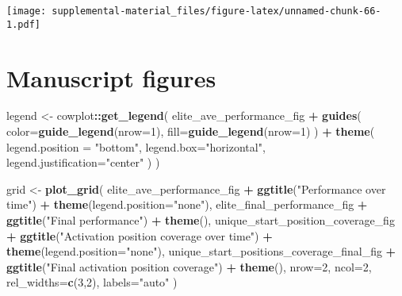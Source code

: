 \documentclass[]{book}
\newenvironment{Shaded}{\begin{snugshade}}{\end{snugshade}}
\newcommand{\DataTypeTok}[1]{\textcolor[rgb]{0.13,0.29,0.53}{#1}}
\newcommand{\DecValTok}[1]{\textcolor[rgb]{0.00,0.00,0.81}{#1}}
\newcommand{\KeywordTok}[1]{\textcolor[rgb]{0.13,0.29,0.53}{\textbf{#1}}}
\newcommand{\NormalTok}[1]{#1}
\newcommand{\OperatorTok}[1]{\textcolor[rgb]{0.81,0.36,0.00}{\textbf{#1}}}
\newcommand{\StringTok}[1]{\textcolor[rgb]{0.31,0.60,0.02}{#1}}
\begin{document}
\texttt{[image: supplemental-material\_files/figure-latex/unnamed-chunk-66-1.pdf]}

\hypertarget{manuscript-figures-5}{%
\section{Manuscript figures}\label{manuscript-figures-5}}

\begin{Shaded}
\begin{Highlighting}[]
\NormalTok{legend <-}\StringTok{ }\NormalTok{cowplot}\OperatorTok{::}\KeywordTok{get_legend}\NormalTok{(}
\NormalTok{    elite_ave_performance_fig }\OperatorTok{+}
\StringTok{      }\KeywordTok{guides}\NormalTok{(}
        \DataTypeTok{color=}\KeywordTok{guide_legend}\NormalTok{(}\DataTypeTok{nrow=}\DecValTok{1}\NormalTok{),}
        \DataTypeTok{fill=}\KeywordTok{guide_legend}\NormalTok{(}\DataTypeTok{nrow=}\DecValTok{1}\NormalTok{)}
\NormalTok{      ) }\OperatorTok{+}
\StringTok{      }\KeywordTok{theme}\NormalTok{(}
        \DataTypeTok{legend.position =} \StringTok{"bottom"}\NormalTok{,}
        \DataTypeTok{legend.box=}\StringTok{"horizontal"}\NormalTok{,}
        \DataTypeTok{legend.justification=}\StringTok{"center"}
\NormalTok{      )}
\NormalTok{  )}

\NormalTok{grid <-}\StringTok{ }\KeywordTok{plot_grid}\NormalTok{(}
\NormalTok{  elite_ave_performance_fig }\OperatorTok{+}
\StringTok{    }\KeywordTok{ggtitle}\NormalTok{(}\StringTok{"Performance over time"}\NormalTok{) }\OperatorTok{+}
\StringTok{    }\KeywordTok{theme}\NormalTok{(}\DataTypeTok{legend.position=}\StringTok{"none"}\NormalTok{),}
\NormalTok{  elite_final_performance_fig }\OperatorTok{+}
\StringTok{    }\KeywordTok{ggtitle}\NormalTok{(}\StringTok{"Final performance"}\NormalTok{) }\OperatorTok{+}
\StringTok{    }\KeywordTok{theme}\NormalTok{(),}
\NormalTok{  unique_start_position_coverage_fig }\OperatorTok{+}
\StringTok{    }\KeywordTok{ggtitle}\NormalTok{(}\StringTok{"Activation position coverage over time"}\NormalTok{) }\OperatorTok{+}
\StringTok{    }\KeywordTok{theme}\NormalTok{(}\DataTypeTok{legend.position=}\StringTok{"none"}\NormalTok{),}
\NormalTok{  unique_start_positions_coverage_final_fig }\OperatorTok{+}
\StringTok{    }\KeywordTok{ggtitle}\NormalTok{(}\StringTok{"Final activation position coverage"}\NormalTok{) }\OperatorTok{+}
\StringTok{    }\KeywordTok{theme}\NormalTok{(),}
  \DataTypeTok{nrow=}\DecValTok{2}\NormalTok{,}
  \DataTypeTok{ncol=}\DecValTok{2}\NormalTok{,}
  \DataTypeTok{rel_widths=}\KeywordTok{c}\NormalTok{(}\DecValTok{3}\NormalTok{,}\DecValTok{2}\NormalTok{),}
  \DataTypeTok{labels=}\StringTok{"auto"}
\NormalTok{)}


\end{Highlighting}
\end{Shaded}
\end{document}
